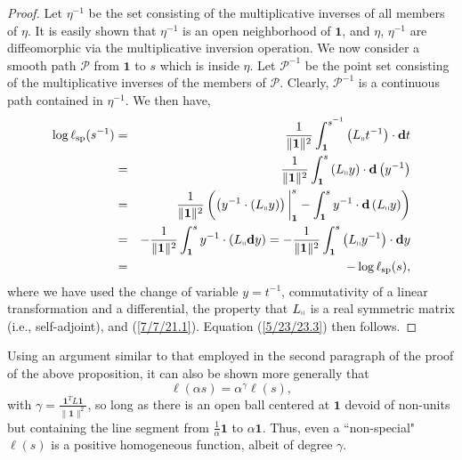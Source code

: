 \documentclass{amsart}
\theoremstyle{definition}
\numberwithin{theorem}{section}
\numberwithin{equation}{section}
\begin{document}
\begin{proof}
Let $\eta^{-1}$ be the set consisting of the multiplicative inverses of all members of $\eta$.  It is easily shown that $\eta^{-1}$ is an open neighborhood of $\mathbf{1}$, and $\eta$, $\eta^{-1}$ are diffeomorphic via the multiplicative inversion operation.  
We now consider a smooth path $\mathcal{P}$ from $\mathbf{1}$ to $s$ which is inside $\eta$.  Let $\mathcal{P}^{-1}$ be the point set consisting of the multiplicative inverses of the members of $\mathcal{P}$.  Clearly, $\mathcal{P}^{-1}$ is a continuous path contained in $\eta^{-1}$. 
 We then have, 
\begin{eqnarray}  \log \ell_{\rm sp}(s^{-1})   &=&   \frac{1}{\|{\bf 1}\|^2} \int_{\bf 1}^{s^{-1}} \left(L_{\shortparallel}t^{-1}\right) \cdot \mathbf{d}t \nonumber \\ &=&  \frac{1}{\|{\bf 1}\|^2} \int_{\bf 1}^s \left(L_{\shortparallel}y\right)\cdot \mathbf{d}\left(y^{-1}\right) \nonumber \\ &=&  \frac{1}{\|{\bf 1}\|^2}\left(\left(y^{-1}\cdot \left(L_{\shortparallel}y\right)\right)\bigg|_{\bf 1}^s - \int_{\bf 1}^s y^{-1}\cdot \mathbf{d}\left(L_{\shortparallel}y\right)\right)   \nonumber \\ &=& -\frac{1}{\|{\bf 1}\|^2} \int_{\bf 1}^s y^{-1}\cdot (L_{\shortparallel}\mathbf{d}y) = -\frac{1}{\|{\bf 1}\|^2} \int_{\bf 1}^s \left(L_{\shortparallel}y^{-1}\right) \cdot \mathbf{d}y  \nonumber \\ &=& -\log \ell_{\rm sp}(s),\label{4/2/23.5} \end{eqnarray} where we have used the change of variable $y=t^{-1}$, commutativity of a linear transformation and a differential, the property that $L_{\shortparallel}$ is a real symmetric matrix (i.e., self-adjoint), and  (\ref{7/7/21.1}).  Equation (\ref{5/23/23.3}) then follows.
\end{proof}

Using an argument similar to that employed in the second paragraph of the proof of the above proposition, it can also be shown more generally that  \[  \ell(\alpha s) = \alpha^\gamma \ell(s),\] with $\gamma = \frac{\mathbf{1}^T L \mathbf{1}}{\|\mathbf{1}\|^2}$, so long as there is an open ball centered at $\mathbf{1}$ devoid of non-units but containing the line segment from $\frac{1}{\alpha}\mathbf{1}$  to $\alpha\mathbf{1}$.  Thus, even a ``non-special" $ \ell(s)$ is a positive homogeneous function, albeit of degree $\gamma$.  
\end{document}
